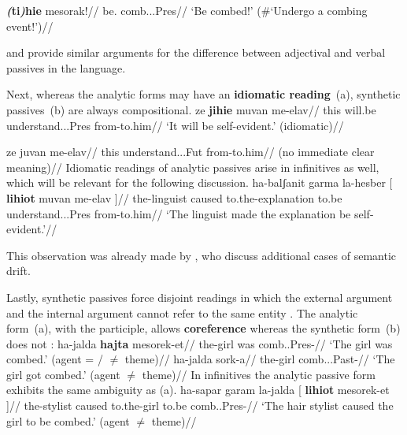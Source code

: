     \a \begingl
        \gla{}\textbf{\emph{(}ti\emph{)}hie} mesorak!//
        \glb be. comb...Pres//
        \glft `Be combed!' (\#`Undergo a combing event!')//
    \endgl
\xe

\cite{horvathsiloni08} and \cite{meltzerasscher11} provide similar arguments for the difference between adjectival and verbal passives in the language. 

Next, whereas the analytic forms may have an \textbf{idiomatic reading}~(\nextx a), synthetic passives~(\nextx b) are always compositional.
\pex \label{ex:idiom}
    \a 
        \begingl
        \gla {}ze \textbf{jihie} muvan me-elav//
        \glb this will.be understand...Pres from-to.him//
        \glft `It will be self-evident.' (idiomatic)//
        \endgl

    \a \ljudge{\#}
        \begingl
        \gla {}ze juvan me-elav//
        \glb this understand...Fut from-to.him//
        \glft (no immediate clear meaning)//
        \endgl
\xe
Idiomatic readings of analytic passives arise in infinitives as well, which will be relevant for the following discussion.
\ex
	\begingl
	\gla ha-balʃanit garma la-hesber [ \textbf{lihiot} muvan me-elav ]//
	\glb the-linguist caused to.the-explanation to.be understand...Pres from-to.him//
	\glft `The linguist made the explanation be self-evident.'//
	\endgl
\xe

This observation was already made by \cite{horvathsiloni08,horvathsiloni09}, who discuss additional cases of semantic drift.

Lastly, synthetic passives force disjoint readings in which the external argument and the internal argument cannot refer to the same entity \citep{bakeretal89}. The analytic form~(\nextx a), with the participle, allows \textbf{coreference} whereas the synthetic form~(\nextx b) does not \citep[720]{sichel09}:
\pex \label{ex:disjoint}
    \a \begingl
        \gla {}ha-jalda \textbf{hajta} mesorek-et//
        \glb the-girl was comb..Pres-//
        \glft `The girl was combed.' (agent = / $\neq$ theme)//
        \endgl
    \a
        \begingl
        \gla {}ha-jalda sork-a//
        \glb the-girl comb...Past-//
        \glft `The girl got combed.' (agent $\neq$ theme)//
        \endgl
\xe
In infinitives the analytic passive form exhibits the same ambiguity as (\lastx a). 
\pex
	\a 	\begingl
	    \gla ha-sapar garam la-jalda [ \textbf{lihiot} mesorek-et ]//
	    \glb the-stylist caused to.the-girl to.be comb..Pres-//
	    \glft `The hair stylist caused the girl to be combed.' (agent $\neq$ theme)//
	    \endgl

